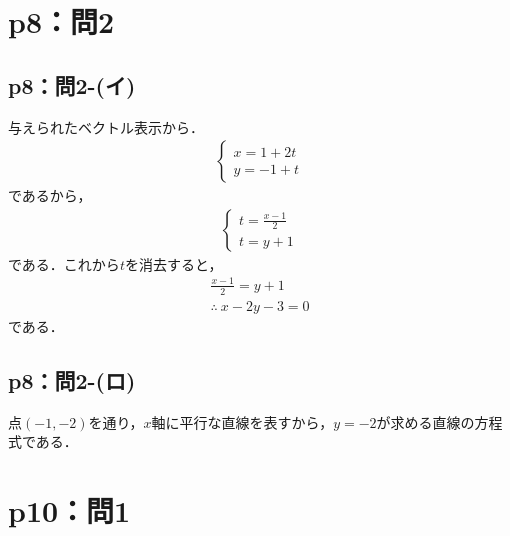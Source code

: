 \documentclass[a4paper,10pt,fleqn]{ltjsarticle}
\begin{document}
\section*{p8：問2}


\subsection*{p8：問2-(イ)}

\begin{tleftbar}
    与えられたベクトル表示から．
    \begin{align*}
        \begin{cases}
            x=1+2t \\
            y=-1+t
        \end{cases}
    \end{align*}
    であるから，
    \begin{align*}
        \begin{cases}
            t=\frac{x-1}{2} \\
            t=y+1
        \end{cases}
    \end{align*}
    である．これから$t$を消去すると，
    \begin{gather*}
        \frac{x-1}{2} = y+1 \\
        \therefore ~ x-2y-3 =0
    \end{gather*}
    である．
\end{tleftbar}


\subsection*{p8：問2-(ロ)}

\begin{tleftbar}
    点$(-1,-2)$を通り，$x$軸に平行な直線を表すから，$y=-2$が求める直線の方程式である．
\end{tleftbar}
%
\newpage
%
%

\section*{p10：問1}
\end{document}
